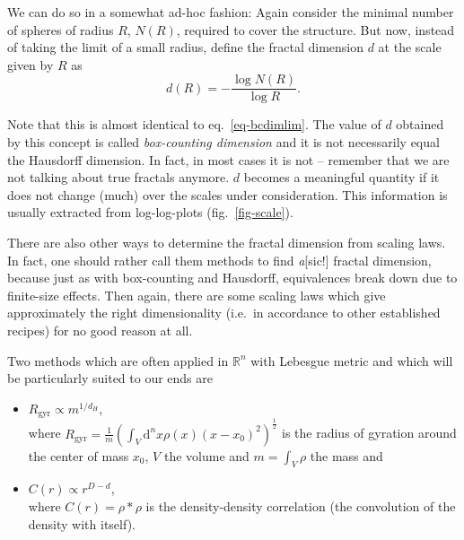 \documentclass[twocolumn, 10pt]{scrartcl}
\begin{document}
            We can do so in a somewhat ad-hoc fashion: Again consider the minimal number of spheres of radius $R$,
            $N(R)$, required to cover the structure. But now, instead of taking the limit of a small radius, define the
            fractal dimension $d$ at the scale given by $R$ as
            \begin{equation}
                d(R)=-\frac{\log N(R)}{\log R}.
                \label{eq-bcdim}
            \end{equation}

            Note that this is almost identical to eq.~\ref{eq-bcdimlim}. 
            The value of $d$ obtained by this concept is called \emph{box-counting dimension} and it is not
            necessarily equal the Hausdorff dimension. In fact, in most cases it is not -- remember that we are not
            talking about true fractals anymore. $d$ becomes a meaningful quantity if it does
            not change (much) over the scales under consideration. This information is usually extracted from
            log-log-plots (fig.~\ref{fig-scale}).

            There are also other ways to determine the fractal dimension from scaling laws. In fact, one should rather
            call them methods to find \emph{a}[sic!] fractal dimension, because just as with box-counting and Hausdorff,
            equivalences break down due to finite-size effects. Then again, there are some scaling laws which give
            approximately the right dimensionality (i.e.\ in accordance to other established recipes) for no good
            reason at all.
            
            Two methods which are often applied in $\mathbb{R}^n$ with Lebesgue metric and which will be particularly
            suited to our ends are
            \begin{itemize}
                \item $R_\mathrm{gyr}\propto m^{1/d_H}$,\\where $R_\mathrm{gyr}=\frac{1}{m}\left(\int_V \mathrm{d}^n x
                    \rho\left(x\right)\left(x-x_0\right)^2\right)^\frac{1}{2}$ is the radius of gyration around the
                    center of mass $x_0$, $V$ the volume and $m=\int_V \rho$ the mass and
                \item $C(r)\propto r^{D-d}$,\\where $C(r)=\rho * \rho$ is the density-density correlation (the
                    convolution of the density with itself).
            \end{itemize}
\end{document}
